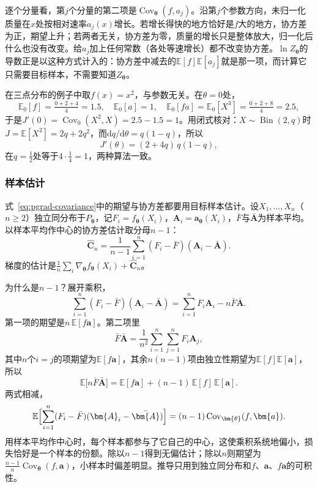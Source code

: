 逐个分量看，第$j$个分量的第二项是$\operatorname{Cov}_{\bm{\theta}}(f,a_{j})$。沿第$j$个参数方向，未归一化质量在$x$处按相对速率$a_{j}(x)$增长。若增长得快的地方恰好是$f$大的地方，协方差为正，期望上升；若两者无关，协方差为零，质量的增长只是整体放大，归一化后什么也没有改变。给$a_{j}$加上任何常数（各处等速增长）都不改变协方差。$\ln Z_{\bm{\theta}}$的导数正是以这种方式计入的：协方差中减去的$\mathbb{E}[f]\mathbb{E}[a_{j}]$就是那一项，而计算它只需要目标样本，不需要知道$Z_{\bm{\theta}}$。

在三点分布的例子中取$f(x)=x^{2}$，与参数无关。在$\theta=0$处，
\[
  \mathbb{E}_{0}[f]=\tfrac{0+2+4}{4}=1.5,\quad\mathbb{E}_{0}[a]=1,\quad\mathbb{E}_{0}[fa]=\mathbb{E}_{0}[X^{3}]=\tfrac{0+2+8}{4}=2.5,
\]
于是$J'(0)=\operatorname{Cov}_{0}(X^{2},X)=2.5-1.5=1$。用闭式核对：$X\sim\operatorname{Bin}(2,q)$时$J=\mathbb{E}[X^{2}]=2q+2q^{2}$，而$\mathrm{d}q/\mathrm{d}\theta=q(1-q)$，所以
\[
  J'(\theta)=(2+4q)\,q(1-q),
\]
在$q=\frac{1}{2}$处等于$4\cdot\frac{1}{4}=1$，两种算法一致。

\subsubsection{样本估计}
\label{sec:pgrad-cov-sample}

式~\eqref{eq:pgrad-covariance}中的期望与协方差都要用目标样本估计。设$X_{1},\dots,X_{n}$（$n\geq2$）独立同分布于$P_{\bm{\theta}}$，记$F_{i}=f_{\bm{\theta}}(X_{i})$，$\bm{A}_{i}=\bm{a}_{\bm{\theta}}(X_{i})$，$\bar{F}$与$\bar{\bm{A}}$为样本平均。以样本平均作中心的协方差估计取分母$n-1$：
\begin{equation}
  \hat{\bm{C}}_{n}=\frac{1}{n-1}\sum_{i=1}^{n}(F_{i}-\bar{F})(\bm{A}_{i}-\bar{\bm{A}}).
  \label{eq:pgrad-cov-estimator}
\end{equation}
梯度的估计是$\frac{1}{n}\sum_{i}\nabla_{\bm{\theta}}f_{\bm{\theta}}(X_{i})+\hat{\bm{C}}_{n}$。

为什么是$n-1$？展开乘积，
\[
  \sum_{i=1}^{n}(F_{i}-\bar{F})(\bm{A}_{i}-\bar{\bm{A}})=\sum_{i=1}^{n}F_{i}\bm{A}_{i}-n\bar{F}\bar{\bm{A}} .
\]
第一项的期望是$n\,\mathbb{E}[f\bm{a}]$。第二项里
\[
  \bar{F}\bar{\bm{A}}=\frac{1}{n^{2}}\sum_{i=1}^{n}\sum_{j=1}^{n}F_{i}\bm{A}_{j},
\]
其中$n$个$i=j$的项期望为$\mathbb{E}[f\bm{a}]$，其余$n(n-1)$项由独立性期望为$\mathbb{E}[f]\mathbb{E}[\bm{a}]$，所以
\[
  \mathbb{E}\bigl[n\bar{F}\bar{\bm{A}}\bigr]=\mathbb{E}[f\bm{a}]+(n-1)\,\mathbb{E}[f]\,\mathbb{E}[\bm{a}].
\]
两式相减，
\[
  \mathbb{E}\Bigl[\sum_{i=1}^{n}(F_{i}-\bar{F})(\bm{A}_{i}-\bar{\bm{A}})\Bigr]=(n-1)\operatorname{Cov}_{\bm{\theta}}(f,\bm{a}).
\]
用样本平均作中心时，每个样本都参与了它自己的中心，这使乘积系统地偏小，损失恰好是一个样本的份额。除以$n-1$得到无偏估计；除以$n$则期望为$\frac{n-1}{n}\operatorname{Cov}_{\bm{\theta}}(f,\bm{a})$，小样本时偏差明显。推导只用到独立同分布和$f$、$\bm{a}$、$f\bm{a}$的可积性。

